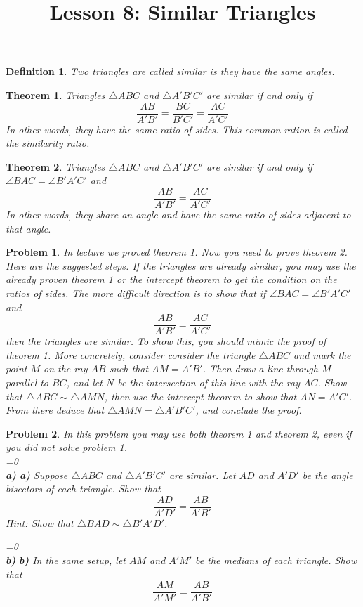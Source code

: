 \documentclass[a4paper,12pt]{article}
\title{Lesson 8: Similar Triangles}
\theoremstyle{perfect}
\newtheorem{thm}{Theorem}
\newtheorem{dfn}{Definition}
\newtheorem{prb}{Problem}
\newcommand{\varline}{0}
\renewcommand\part[1]{
\ifnum\pdfstrcmp{\varline}{1}=0
    \vspace{.10in}\textbf{\\#1)}
  \else
    \textbf{#1)}
  \fi\renewcommand{\varline}{1}}
\begin{document}
 
\maketitle

\begin{dfn}
Two triangles are called \textit{similar} is they have the same angles.  
\end{dfn}

\begin{thm}
Triangles $\triangle ABC$ and $\triangle A'B'C'$ are similar if and only if $$\frac{AB}{A'B'} = \frac{BC}{B'C'} = \frac{AC}{A'C'}$$
In other words, they have the same ratio of sides. This common ration is called the \textit{similarity ratio}.
\end{thm}
\begin{thm}
Triangles $\triangle ABC$ and $\triangle A'B'C'$ are similar if and only if $\angle BAC = \angle B'A'C'$ and $$\frac{AB}{A'B'} = \frac{AC}{A'C'}$$
In other words, they share an angle and have the same ratio of sides adjacent to that angle.
\end{thm}
\begin{prb}
In lecture we proved theorem 1. Now you need to prove theorem 2. Here are the suggested steps. If the triangles are already similar, you may use the already proven theorem 1 or the intercept theorem to get the condition on the ratios of sides. The more difficult direction is to show that if $\angle BAC = \angle B'A'C'$ and $$\frac{AB}{A'B'} = \frac{AC}{A'C'}$$ then the triangles are similar. To show this, you should mimic the proof of theorem 1. More concretely, consider consider the triangle $\triangle ABC$ and mark the point $M$ on the ray $AB$ such that $AM = A'B'$. Then draw a line through $M$ parallel to $BC$, and let $N$ be the intersection of this line with the ray $AC$. Show that $\triangle ABC \sim \triangle AMN$, then use the intercept theorem to show that $AN = A'C'$. From there deduce that $\triangle AMN = \triangle A'B'C'$, and conclude the proof.
\end{prb}

\begin{prb}
In this problem you may use both theorem 1 and theorem 2, even if you did not solve problem 1.\\
\part{a} Suppose $\triangle ABC$ and $\triangle A'B'C'$ are similar. Let $AD$ and $A'D'$ be the angle bisectors of each triangle. Show that $$\frac{AD}{A'D'} = \frac{AB}{A'B'}$$
\textit{Hint: Show that $\triangle BAD \sim \triangle B'A'D'$.}
\part{b} In the same setup, let $AM$ and $A'M'$ be the medians of each triangle. Show that $$\frac{AM}{A'M'} = \frac{AB}{A'B'}$$
\end{prb}
\end{document}
